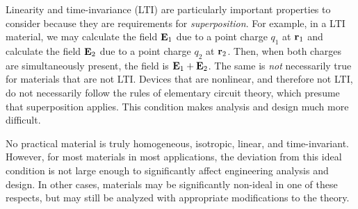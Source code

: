 Linearity and time-invariance (LTI) 
are particularly important properties to consider because they are requirements for {\it superposition}.  
For example, in a LTI material, we may calculate the field ${\bf E}_1$ due to a point charge $q_1$ at ${\bf r}_1$ and calculate the field ${\bf E}_2$ due to a point charge $q_2$ at ${\bf r}_2$. Then, when both charges are simultaneously present, the field is ${\bf E}_1+{\bf E}_2$.  The same is \emph{not} necessarily true for materials that are not LTI.  Devices that are nonlinear, and therefore not LTI, do not necessarily follow the rules of elementary circuit theory, which presume that superposition applies. 
This condition makes analysis and design much more difficult. 

No practical material is truly homogeneous, isotropic, linear, and time-invariant.  
However, for most materials in most applications, the deviation from this ideal condition is not large enough to significantly affect engineering analysis and design.
In other cases, materials may be significantly non-ideal in one of these respects, but may still be analyzed with appropriate modifications to the theory.

